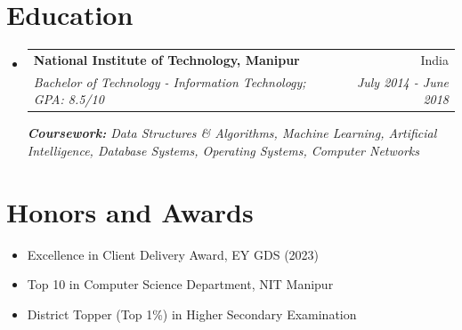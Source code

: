 \documentclass[a4paper,12pt]{article}
\makeatletter
\newcommand{\resumeSubheading}[4]{
  \vspace{-1pt}\item
    \begin{tabular*}{0.97\textwidth}{l@{\extracolsep{\fill}}r}
      \textbf{#1} & #2 \\
      \textit{#3} & \textit{#4} \\
    \end{tabular*}\vspace{-5pt}
}
\newcommand{\resumeSubHeadingListStart}{\begin{itemize}[leftmargin=*]}
\newcommand{\resumeSubHeadingListEnd}{\end{itemize}}
\makeatother
\begin{document}
\section{Education}
  \resumeSubHeadingListStart
    \resumeSubheading
      {National Institute of Technology, Manipur}{India}
      {Bachelor of Technology - Information Technology; GPA: 8.5/10}{July 2014 - June 2018}
      {\scriptsize \textit{ \footnotesize{\newline{}\textbf{Coursework:} Data Structures \& Algorithms, Machine Learning, Artificial Intelligence, Database Systems, Operating Systems, Computer Networks}}}
  \resumeSubHeadingListEnd

\section{Honors and Awards}
\resumeSubHeadingListStart
  \item {Excellence in Client Delivery Award, EY GDS (2023)}
  \item {Top 10 in Computer Science Department, NIT Manipur}
  \item {District Topper (Top 1\%) in Higher Secondary Examination}
\resumeSubHeadingListEnd

\end{document}

